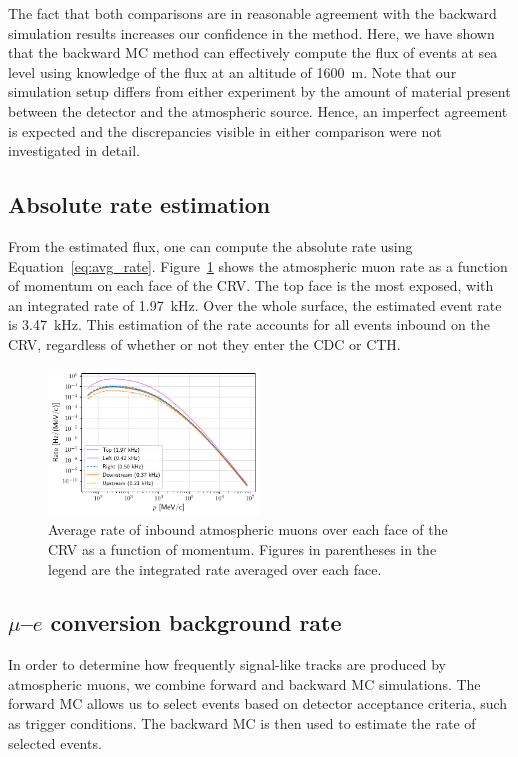 The fact that both comparisons are in reasonable agreement with the backward
simulation results increases our confidence in the method. Here, we have shown
that the backward MC method can effectively compute the flux of events at sea
level using knowledge of the flux at an altitude of \SI{1600}{\metre}. Note that
our simulation setup differs from either experiment by the amount of material
present between the detector and the atmospheric source. Hence, an imperfect
agreement is expected and the discrepancies visible in either comparison were not
investigated in detail.

\subsection{Absolute rate estimation}
From the estimated flux, one can compute the absolute rate using
Equation~\ref{eq:avg_rate}. Figure~\ref{fig:avg_rate_per_face} shows the
atmospheric muon rate as a function of momentum on each face of the CRV. The top
face is the most exposed, with an integrated rate of \SI{1.97}{\kHz}. Over the
whole surface, the estimated event rate is \SI{3.47}{\kHz}. This estimation of
the rate accounts for all events inbound on the CRV, regardless of whether or
not they enter the CDC or CTH. 


\begin{figure}
    \centering
    \includegraphics[width=0.5\textwidth]{chapter5/rate_vs_p.pdf}
    \caption{
        Average rate of inbound atmospheric muons over each face of the CRV as a
        function of momentum. Figures in parentheses in the legend are the
        integrated rate averaged over each face.
    }
    \label{fig:avg_rate_per_face}
\end{figure}

\subsection{\texorpdfstring{$\mu$--$e$}{Muon-to-electron} conversion background
rate}
\label{sec:bmc_conversion_bg_rate}
In order to determine how frequently signal-like tracks are produced by
atmospheric muons, we combine forward and backward MC simulations. The forward
MC allows us to select events based on detector acceptance criteria, such as
trigger conditions. The backward MC is then used to estimate the rate of
selected events.

